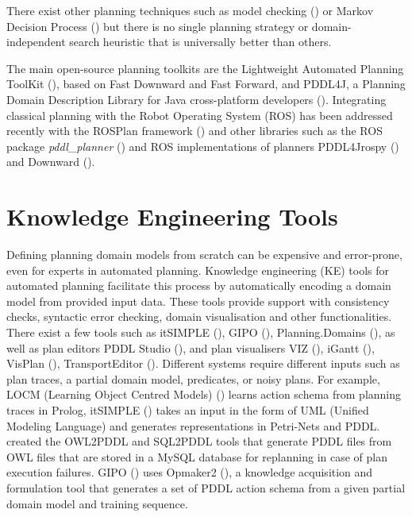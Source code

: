 There exist other planning techniques such as model checking (\cite{triantafillou2015unifying}) or Markov Decision Process (\cite{kolobov2012planning}) but there is no single planning strategy or domain-independent search heuristic that is universally better than others.

The main open-source planning toolkits are the Lightweight Automated Planning ToolKit (\cite{lapkt}), based on Fast Downward and Fast Forward, and PDDL4J, a Planning Domain Description Library for Java cross-platform developers (\cite{pellier2018pddl4j}).
Integrating classical planning with the Robot Operating System (ROS) has been addressed recently \eg with the ROSPlan framework (\cite{cashmore2015rosplan}) and other libraries such as the ROS package \textit{pddl_planner} (\cite{pddlplanner}) and ROS implementations of planners \eg PDDL4Jrospy (\cite{pddl4jrospy}) and Downward (\cite{downward}).


\section{Knowledge Engineering Tools}\label{subsec:Knowledge Engineering}
Defining planning domain models from scratch can be expensive and error-prone, even for experts in automated planning.
Knowledge engineering (KE) tools for automated planning facilitate this process by automatically encoding a domain model from provided input data.
These tools provide support with consistency checks, syntactic error checking, domain visualisation and other functionalities.
There exist a few tools such as itSIMPLE (\cite{vaquero2013itsimple}), GIPO (\cite{simpson2007planning}), Planning.Domains (\cite{muise2016planning}), 
as well as plan editors \eg PDDL Studio (\cite{plch2012inspect}), and plan visualisers \eg VIZ (\cite{vodrazka2010visual}), iGantt (\cite{bartak2009local}), VisPlan (\cite{glinsky2011visplan}), TransportEditor (\cite{vskopek2017transporteditor}).
Different systems require different inputs such as plan traces, a partial domain model, predicates, or noisy plans.
For example, LOCM (Learning Object Centred Models) (\cite{cresswell2013acquiring}) learns action schema from planning traces in Prolog, 
itSIMPLE () takes an input in the form of UML (Unified Modeling Language) %
and generates representations in Petri-Nets %
and PDDL. 
\cite{kootbally2015towards} created the OWL2PDDL and SQL2PDDL tools that generate PDDL files from OWL files that are stored in a MySQL database for replanning in case of plan execution failures.
GIPO () uses Opmaker2 (\cite{mccluskey2009automated}), a knowledge acquisition and formulation tool that generates a set of PDDL action schema from a given partial domain model and training sequence.


